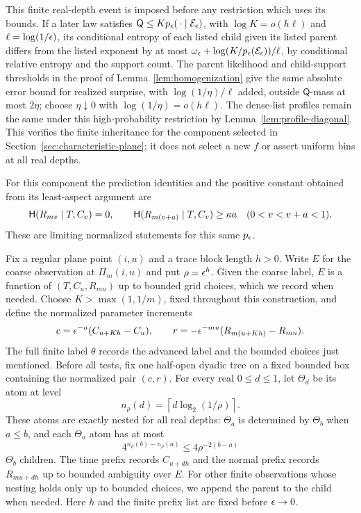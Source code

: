 This finite real-depth event is imposed before any restriction which
uses its bounds.  If a later law satisfies
$\mathsf Q\le Kp_\epsilon(\,\cdot\mid\mathcal E_\epsilon)$, with
$\log K=o(h\ell)$ and $\ell=\log(1/\epsilon)$, its conditional entropy
of each listed child given its listed parent differs from the listed exponent by
at most $\omega_\epsilon+\log(K/p_\epsilon(\mathcal E_\epsilon))/\ell$, by
conditional relative entropy and the support count.  The parent
likelihood and child-support thresholds in the proof of
Lemma~\ref{lem:homogenization} give the same absolute error bound for
realized surprise, with $\log(1/\eta)/\ell$ added, outside
$\mathsf Q$-mass at most $2\eta$; choose $\eta\downarrow0$ with
$\log(1/\eta)=o(h\ell)$.  The dense-list
profiles remain the same under this high-probability restriction by
Lemma~\ref{lem:profile-diagonal}.  This verifies the finite inheritance
for the component selected in Section~\ref{sec:characteristic-plane};
it does not select a new $f$ or assert uniform bins at all real depths.

For this component the prediction identities and the positive constant
obtained from its least-aspect argument are
\begin{equation}
 \mathsf H(R_{mv}\mid T,C_v)=0,\qquad
 \mathsf H(R_{m(v+a)}\mid T,C_v)\ge\kappa a
 \quad(0<v<v+a<1).
 \label{eq:rate-prediction}
\end{equation}
These are limiting normalized statements for this same $p_\epsilon$.

Fix a regular plane point $(i,u)$ and a trace block length $h>0$.
Write $E$ for the coarse observation at $\Pi_m(i,u)$ and put
$\rho=\epsilon^h$.  Given the coarse label, $E$ is a function of
$(T,C_u,R_{mu})$ up to bounded grid choices, which we record when
needed.  Choose $K>\max(1,1/m)$, fixed throughout this construction,
and define the normalized parameter increments
\[
 c=\epsilon^{-u}(C_{u+Kh}-C_u),\qquad
 r=-\epsilon^{-mu}(R_{m(u+Kh)}-R_{mu}).
\]
The full finite label $\theta$ records the advanced label and the
bounded choices just mentioned.  Before all tests, fix one half-open
dyadic tree on a fixed bounded box containing the normalized pair
$(c,r)$.  For every real $0\le d\le1$, let $\Theta_d$ be its atom at
level
\[
 n_\rho(d)=\left\lceil d\log_2(1/\rho)\right\rceil.
\]
These atoms are exactly nested for all real depths: $\Theta_a$ is
determined by $\Theta_b$ when $a\le b$, and each $\Theta_a$ atom has
at most
\[
 4^{n_\rho(b)-n_\rho(a)}\le4\rho^{-2(b-a)}
\]
$\Theta_b$ children.  The time prefix records $C_{u+dh}$ and the
normal prefix records $R_{mu+dh}$ up to bounded ambiguity over $E$.
For other finite observations whose nesting holds only up to bounded
choices, we append the parent to the child when needed.  Here $h$ and
the finite prefix list are fixed before $\epsilon\to0$.

